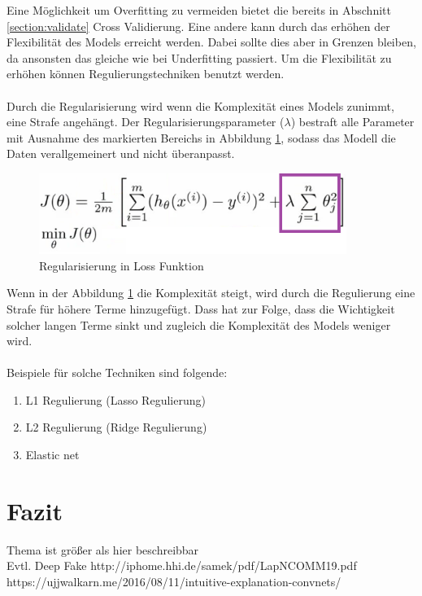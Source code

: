 \documentclass[12pt,oneside,a4paper,parskip]{scrbook}
\begin{document}
Eine Möglichkeit um Overfitting zu vermeiden bietet die bereits in Abschnitt \ref{section:validate} Cross Validierung. Eine andere kann durch das erhöhen der Flexibilität des Models erreicht werden. Dabei sollte dies aber in Grenzen bleiben, da ansonsten das gleiche wie bei Underfitting passiert. Um die Flexibilität zu erhöhen können Regulierungstechniken benutzt werden.
\\\\
Durch die Regularisierung wird wenn die Komplexität eines Models zunimmt, eine Strafe angehängt. Der Regularisierungsparameter (${\lambda}$) bestraft alle Parameter mit Ausnahme des markierten Bereichs in Abbildung \ref{fig:regFunc}, sodass das Modell die Daten verallgemeinert und nicht überanpasst.

\begin{figure}[h]
	\begin{center}
		\includegraphics[width=10cm]{Bilder/regFunc.png}
		\caption{Regularisierung in Loss Funktion}
		\label{fig:regFunc}
	\end{center}
\end{figure}

Wenn in der Abbildung \ref{fig:regFunc} die Komplexität steigt, wird durch die Regulierung eine Strafe für höhere Terme hinzugefügt. Dass hat zur Folge, dass die Wichtigkeit solcher langen Terme sinkt und zugleich die Komplexität des Models weniger wird.
\\\\
Beispiele für solche Techniken sind folgende:

\begin{enumerate}
	\item L1 Regulierung (Lasso Regulierung)
	\item L2 Regulierung (Ridge Regulierung)
	\item Elastic net
\end{enumerate}


\chapter{Fazit}
Thema ist größer als hier beschreibbar
\\Evtl. Deep Fake
http://iphome.hhi.de/samek/pdf/LapNCOMM19.pdf
https://ujjwalkarn.me/2016/08/11/intuitive-explanation-convnets/



\backmatter


\cleardoublepage
{}
{}
\printbibliography
\end{document}
